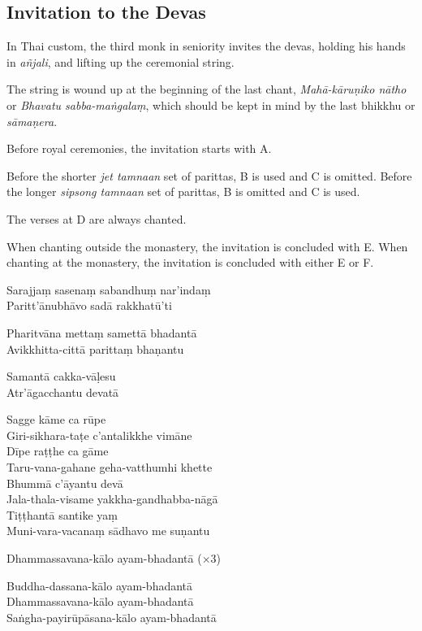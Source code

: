 \subsection{Invitation to the Devas}
\label{paritta-devas}


\enlargethispage{\baselineskip}

In Thai custom, the third monk in seniority invites the devas, holding his
hands in \emph{añjali}, and lifting up the ceremonial string.

The string is wound up at the beginning of the last chant, \emph{Mahā-kāruṇiko
  nātho} or \emph{Bhavatu sabba-maṅgalaṃ}, which should be kept in mind by the
last bhikkhu or \emph{sāmaṇera}.

Before royal ceremonies, the invitation starts with A.

Before the shorter \emph{jet tamnaan} set of parittas, B is used and C is
omitted. Before the longer \emph{sipsong tamnaan} set of parittas, B is
omitted and C is used.

The verses at D are always chanted.

When chanting outside the monastery, the invitation is concluded with E. When
chanting at the monastery, the invitation is concluded with either E or F.

\clearpage

\begin{paritta}


%
Sarajjaṃ sasenaṃ sabandhuṃ nar'indaṃ\\
Paritt'ānubhāvo sadā rakkhatū'ti

%
Pharitvāna mettaṃ samettā bhadantā\\
Avikkhitta-cittā parittaṃ bhaṇantu

%
Samantā cakka-vāḷesu\\
Atr'āgacchantu devatā

%
Sagge kāme ca rūpe\\
Giri-sikhara-taṭe c'antalikkhe vimāne\\
Dīpe raṭṭhe ca gāme\\
Taru-vana-gahane geha-vatthumhi khette\\
Bhummā c'āyantu devā\\
Jala-thala-visame yakkha-gandhabba-nāgā\\
Tiṭṭhantā santike yaṃ\\
Muni-vara-vacanaṃ sādhavo me suṇantu

%
Dhammassavana-kālo ayam-bhadantā (×3)


%
Buddha-dassana-kālo ayam-bhadantā\\
Dhammassavana-kālo ayam-bhadantā\\
Saṅgha-payirūpāsana-kālo ayam-bhadantā
\end{paritta}

